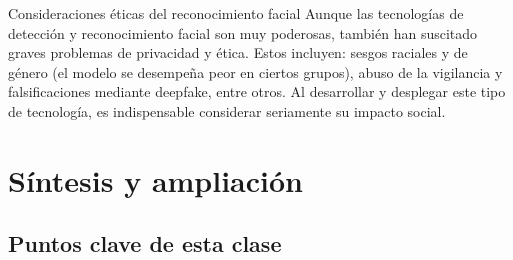 \documentclass[a4paper]{article}
\begin{document}
\begin{warningbox}{Consideraciones éticas del reconocimiento facial}
Aunque las tecnologías de detección y reconocimiento facial son muy poderosas, también han suscitado graves problemas de privacidad y ética. Estos incluyen: sesgos raciales y de género (el modelo se desempeña peor en ciertos grupos), abuso de la vigilancia y falsificaciones mediante deepfake, entre otros. Al desarrollar y desplegar este tipo de tecnología, es indispensable considerar seriamente su impacto social.
\end{warningbox}

\newpage
\section{Síntesis y ampliación}

\subsection{Puntos clave de esta clase}
\end{document}
